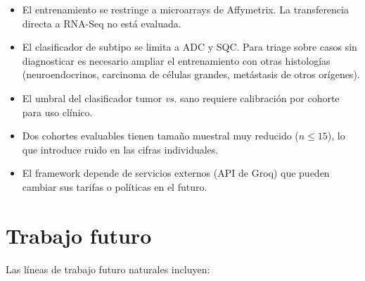 \begin{itemize}
  \item El entrenamiento se restringe a microarrays de Affymetrix. La
  transferencia directa a RNA-Seq no está evaluada.
  \item El clasificador de subtipo se limita a ADC y SQC. Para triage
  sobre casos sin diagnosticar es necesario ampliar el entrenamiento con
  otras histologías (neuroendocrinos, carcinoma de células grandes,
  metástasis de otros orígenes).
  \item El umbral del clasificador tumor \emph{vs.} sano requiere
  calibración por cohorte para uso clínico.
  \item Dos cohortes evaluables tienen tamaño muestral muy reducido
  ($n \leq 15$), lo que introduce ruido en las cifras individuales.
  \item El framework depende de servicios externos (API de Groq) que
  pueden cambiar sus tarifas o políticas en el futuro.
\end{itemize}

\section{Trabajo futuro}
\label{sec:conc_futuro}

Las líneas de trabajo futuro naturales incluyen:

